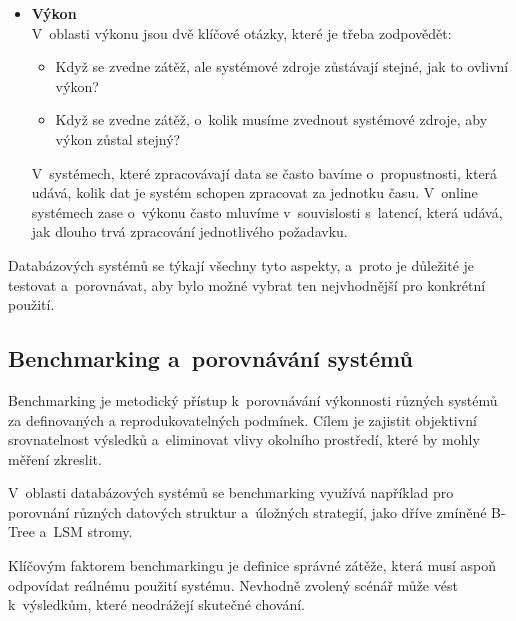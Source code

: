 \begin{itemize}
    Také je důležité identifikovat, kde se nacházejí úzká hrdla systému, která mohou omezovat jeho škálovatelnost.
    V~jednom systému mohou být problém celkové průměrné zvednutí uživatelů, ale v~jiném systému může být extrémní nárůst uživatelů v~určité období - odlehlé hodnoty. \cite{kleppmann2017designing}
    
    \item \textbf{Výkon} \\
    V~oblasti výkonu jsou dvě klíčové otázky, které je třeba zodpovědět:
    \begin{itemize}
        \item Když se zvedne zátěž, ale systémové zdroje zůstávají stejné, jak to ovlivní výkon?
        \item Když se zvedne zátěž, o~kolik musíme zvednout systémové zdroje, aby výkon zůstal stejný?
    \end{itemize}

    V~systémech, které zpracovávají data se často bavíme o~propustnosti, která udává, kolik dat je systém schopen zpracovat za jednotku času.
    V~online systémech zase o~výkonu často mluvíme v~souvislosti s~latencí, která udává, jak dlouho trvá zpracování jednotlivého požadavku. \cite{kleppmann2017designing}
\end{itemize}

Databázových systémů se týkají všechny tyto aspekty, a~proto je důležité je testovat a~porovnávat, aby bylo možné vybrat ten nejvhodnější pro konkrétní použití.

\subsection{Benchmarking a~porovnávání systémů}

Benchmarking je metodický přístup k~porovnávání výkonnosti různých systémů za definovaných a
reprodukovatelných podmínek. Cílem je zajistit objektivní srovnatelnost výsledků a~eliminovat
vlivy okolního prostředí, které by mohly měření zkreslit.

V~oblasti databázových systémů se benchmarking využívá například pro porovnání různých
datových struktur a~úložných strategií, jako dříve zmíněné B-Tree a~LSM stromy. 
\cite{kleppmann2017designing}

Klíčovým faktorem benchmarkingu je definice správné zátěže, která musí aspoň odpovídat \mbox{reálnému} použití
systému. Nevhodně zvolený scénář může vést k~výsledkům, které neodrážejí skutečné chování.

